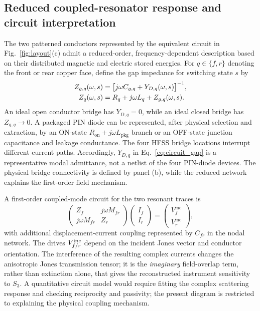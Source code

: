 \documentclass{ieeeaccess}
\begin{document}
\subsection{Reduced coupled-resonator response and circuit interpretation}
The two patterned conductors represented by the equivalent circuit in Fig.~\ref{fig:layout}(c) admit a reduced-order, frequency-dependent description based on their distributed magnetic and electric stored energies. For $q\in\{f,r\}$ denoting the front or rear copper face, define the gap impedance for switching state $s$ by
\begin{align}
 Z_{g,q}(\omega,s)&=\big[j\omega C_{g,q}+Y_{D,q}(\omega,s)\big]^{-1},\notag\\
 Z_q(\omega,s)&=R_q+j\omega L_q+Z_{g,q}(\omega,s).
 \label{eq:circuit_gap}
\end{align}
An ideal open conductor bridge has $Y_{D,q}=0$, while an ideal closed bridge has $Z_{g,q}\rightarrow0$. A packaged PIN diode can be represented, after physical selection and extraction, by an ON-state $R_{\mathrm{on}}+j\omega L_{\mathrm{pkg}}$ branch or an OFF-state junction capacitance and leakage conductance. The four HFSS bridge locations interrupt different current paths. Accordingly, $Y_{D,q}$ in Eq.~\eqref{eq:circuit_gap} is a representative modal admittance, not a netlist of the four PIN-diode devices. The physical bridge connectivity is defined by panel (b), while the reduced network explains the first-order field mechanism.

A first-order coupled-mode circuit for the two resonant traces is
\begin{equation}
\begin{pmatrix}Z_f&j\omega M_{fr}\\j\omega M_{fr}&Z_r\end{pmatrix}
\begin{pmatrix}I_f\\I_r\end{pmatrix}
=\begin{pmatrix}V_f^{\mathrm{inc}}\\V_r^{\mathrm{inc}}\end{pmatrix},
\label{eq:coupled_circuit}
\end{equation}
with additional displacement-current coupling represented by $C_{fr}$ in the nodal network. The drives $V_{f/r}^{\rm inc}$ depend on the incident Jones vector and conductor orientation. The interference of the resulting complex currents changes the anisotropic Jones transmission tensor; it is the \emph{imaginary} field-overlap term, rather than extinction alone, that gives the reconstructed instrument sensitivity to $S_3$. A quantitative circuit model would require fitting the complex scattering response and checking reciprocity and passivity; the present diagram is restricted to explaining the physical coupling mechanism.
\end{document}
